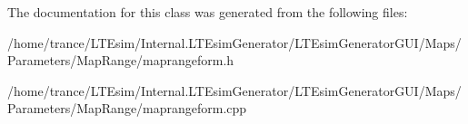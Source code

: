 The documentation for this class was generated from the following files\+:\begin{DoxyCompactItemize}
\item 
/home/trance/\+L\+T\+Esim/\+Internal.\+L\+T\+Esim\+Generator/\+L\+T\+Esim\+Generator\+G\+U\+I/\+Maps/\+Parameters/\+Map\+Range/maprangeform.\+h\item 
/home/trance/\+L\+T\+Esim/\+Internal.\+L\+T\+Esim\+Generator/\+L\+T\+Esim\+Generator\+G\+U\+I/\+Maps/\+Parameters/\+Map\+Range/maprangeform.\+cpp\end{DoxyCompactItemize}
